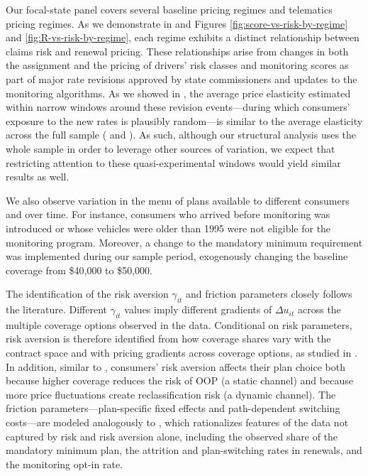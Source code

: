 Our focal-state panel covers several baseline pricing regimes and telematics pricing regimes. As we demonstrate in  and Figures \ref{fig:score-vs-risk-by-regime} and \ref{fig:R-vs-risk-by-regime}, each regime exhibits a distinct relationship between claims risk and renewal pricing. These relationships arise from changes in both the assignment and the pricing of drivers' risk classes and monitoring scores as part of major rate revisions approved by state commissioners and updates to the monitoring algorithms.
As we showed in , the average price elasticity estimated within narrow windows around these revision events---during which consumers' exposure to the new rates is plausibly random---is similar to the average elasticity across the full sample ( and ). As such, although our structural analysis uses the whole sample in order to leverage other sources of variation, we expect that restricting attention to these quasi-experimental windows would yield similar results as well.

We also observe variation in the menu of plans available to different consumers and over time.
For instance, consumers who arrived before monitoring was introduced or whose vehicles were older than 1995 were not eligible for the monitoring program.
Moreover, a change to the mandatory minimum requirement was implemented during our sample period, exogenously changing the baseline coverage from \$40,000 to \$50,000.

The identification of the risk aversion $\gamma_{it}$ and friction parameters closely follows the literature. Different $\gamma_{it}$ values imply different gradients of $\Delta u_{it}$ across the multiple coverage options observed in the data. Conditional on risk parameters, risk aversion is therefore identified from how coverage shares vary with the contract space and with pricing gradients across coverage options, as studied in \textcite{kircher2015inferring, barseghyan2018estimating}. In addition, similar to \textcite{Handel2015}, consumers' risk aversion affects their plan choice both because higher coverage reduces the risk of OOP (a static channel) and because more price fluctuations create reclassification risk (a dynamic channel). The friction parameters---plan-specific fixed effects and path-dependent switching costs---are modeled analogously to \textcite{Handel2013}, which rationalizes features of the data not captured by risk and risk aversion alone, including the observed share of the mandatory minimum plan, the attrition and plan-switching rates in renewals, and the monitoring opt-in rate.

